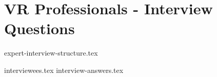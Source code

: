
\appendix
\chapter{VR Professionals - Interview Questions}
\label{appendix:ex-interview-structure}
{expert-interview-structure.tex}


\label{appendix:interviewees}
{interviewees.tex}
{interview-answers.tex}
